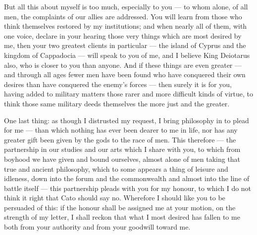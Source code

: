  But all this about myself is too much, especially to you --- to whom alone, of all men, the complaints of our allies are addressed. You will learn from those who think themselves restored by my institutions; and when nearly all of them, with one voice, declare in your hearing those very things which are most desired by me, then your two greatest clients in particular --- the island of Cyprus and the kingdom of Cappadocia --- will speak to you of me, and I believe King Deiotarus also, who is closer to you than anyone. And if these things are even greater --- and through all ages fewer men have been found who have conquered their own desires than have conquered the enemy's forces --- then surely it is for you, having added to military matters those rarer and more difficult kinds of virtue, to think those same military deeds themselves the more just and the greater.

 One last thing: as though I distrusted my request, I bring philosophy in to plead for me --- than which nothing has ever been dearer to me in life, nor has any greater gift been given by the gods to the race of men. This therefore --- the partnership in our studies and our arts which I share with you, to which from boyhood we have given and bound ourselves, almost alone of men taking that true and ancient philosophy, which to some appears a thing of leisure and idleness, down into the forum and the commonwealth and almost into the line of battle itself --- this partnership pleads with you for my honour, to which I do not think it right that Cato should say no. Wherefore I should like you to be persuaded of this: if the honour shall be assigned me at your motion, on the strength of my letter, I shall reckon that what I most desired has fallen to me both from your authority and from your goodwill toward me.

